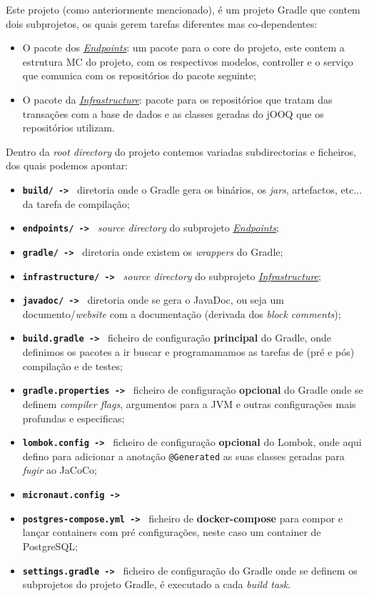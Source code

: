 Este projeto (como anteriormente mencionado), é um projeto Gradle que contem dois subprojetos, os quais gerem tarefas diferentes mas co-dependentes:

\begin{itemize}
  \item O pacote dos \hyperref[endp]{\textit{Endpoints}}: um pacote para o core do projeto, este contem a estrutura MC do projeto, com os respectivos modelos, controller e o serviço que comunica com os repositórios do pacote seguinte;
  \item O pacote da \hyperref[infra]{\textit{Infrastructure}}: pacote para os repositórios que tratam das transações com a base de dados e as classes geradas do jOOQ que os repositórios utilizam.
\end{itemize}

Dentro da \textit{root directory} do projeto contemos variadas subdirectorias e ficheiros, dos quais podemos apontar:

\begin{itemize}
  \item \texttt{\textbf{build/ -> }} diretoria onde o Gradle gera os binários, os \textit{jars}, artefactos, etc... da tarefa de compilação;
  \item \texttt{\textbf{endpoints/ -> }} \textit{source directory} do subprojeto \hyperref[endp]{\textit{Endpoints}};
  \item \texttt{\textbf{gradle/ -> }} diretoria onde existem os \textit{wrappers} do Gradle;
  \item \texttt{\textbf{infrastructure/ -> }} \textit{source directory} do subprojeto \hyperref[infra]{\textit{Infrastructure}};
  \item \texttt{\textbf{javadoc/ -> }} diretoria onde se gera o JavaDoc, ou seja um documento/\textit{website} com a documentação (derivada dos \textit{block comments});
  \item \texttt{\textbf{build.gradle -> }} ficheiro de configuração \textbf{principal} do Gradle, onde definimos os pacotes a ir buscar e programamamos as tarefas de (pré e pós) compilação e de testes;
  \item \texttt{\textbf{gradle.properties -> }} ficheiro de configuração \textbf{opcional} do Gradle onde se definem \textit{compiler flags}, argumentos para a JVM e outras configurações mais profundas e especificas;
  \item \texttt{\textbf{lombok.config -> }} ficheiro de configuração \textbf{opcional} do Lombok, onde aqui defino para adicionar a anotação \texttt{@Generated} as suas classes geradas para \textit{fugir} ao JaCoCo;
  \item \texttt{\textbf{micronaut.config -> }}
  \item \texttt{\textbf{postgres-compose.yml -> }} ficheiro de \textbf{docker-compose} para compor e lançar containers com pré configurações, neste caso um container de PostgreSQL;
  \item \texttt{\textbf{settings.gradle -> }} ficheiro de configuração do Gradle onde se definem os subprojetos do projeto Gradle, é executado a cada \textit{build task}.
\end{itemize}

